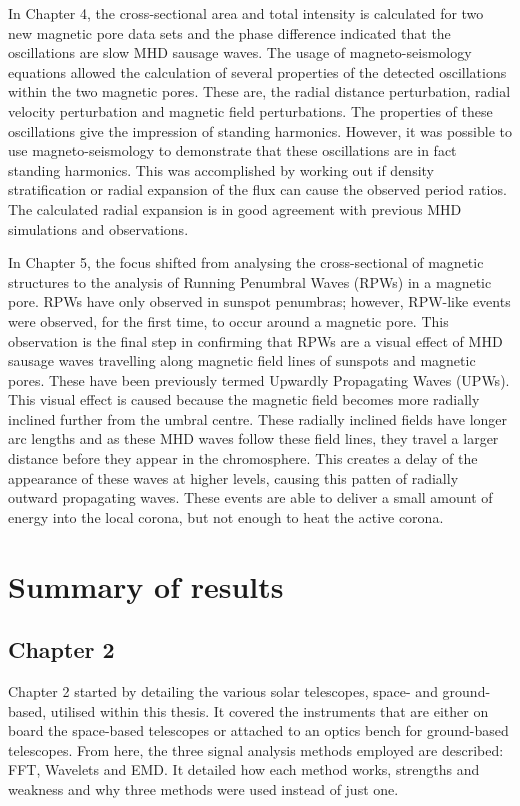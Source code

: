     In Chapter 4, the cross-sectional area and total intensity is calculated for two new magnetic pore data sets and the phase difference indicated that the oscillations are slow MHD sausage waves.
    The usage of magneto-seismology equations allowed the calculation of several properties of the detected oscillations within the two magnetic pores.
    These are, the radial distance perturbation, radial velocity perturbation and magnetic field perturbations.
    The properties of these oscillations give the impression of standing harmonics.
    However, it was possible to use magneto-seismology to demonstrate that these oscillations are in fact standing harmonics.
    This was accomplished by working out if density stratification or radial expansion of the flux can cause the observed period ratios.
    The calculated radial expansion is in good agreement with previous MHD simulations and observations. 
    
    In Chapter 5, the focus shifted from analysing the cross-sectional of magnetic structures to the analysis of Running Penumbral Waves (RPWs) in a magnetic pore.
    RPWs have only observed in sunspot penumbras; however, RPW-like events were observed, for the first time, to occur around a magnetic pore.
    This observation is the final step in confirming that RPWs are a visual effect of MHD sausage waves travelling along magnetic field lines of sunspots and magnetic pores.
    These have been previously termed Upwardly Propagating Waves (UPWs).
    This visual effect is caused because the magnetic field becomes more radially inclined further from the umbral centre.
    These radially inclined fields have longer arc lengths and as these MHD waves follow these field lines, they travel a larger distance before they appear in the chromosphere.
    This creates a delay of the appearance of these waves at higher levels, causing this patten of radially outward propagating waves.
    These events are able to deliver a small amount of energy into the local corona, but not enough to heat the active corona.
       
\section{Summary of results}

	\subsection{Chapter 2}

    Chapter 2 started by detailing the various solar telescopes, space- and ground-based, utilised within this thesis.
    It covered the instruments that are either on board the space-based telescopes or attached to an optics bench for ground-based telescopes.
    From here, the three signal analysis methods employed are described: FFT, Wavelets and EMD.
    It detailed how each method works, strengths and weakness and why three methods were used instead of just one.
    
